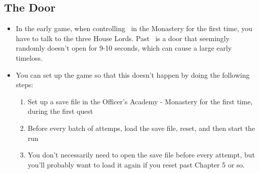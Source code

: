 \subsection*{The Door}
\begin{itemize}
\item In the early game, when controlling \Byleth\ in the Monastery for the first time, you have to talk to the three House Lords. Past \Edelgard\ is a door that seemingly randomly doesn't open for 9-10 seconds, which can cause a large early timeloss.
\item You can set up the game so that this doesn't happen by doing the following steps:
\begin{enumerate}
	\item Set up a save file in the Officer's Academy - Monastery for the first time, during the first quest
	\item Before every batch of attemps, load the save file, reset, and then start the run
	\item You don't necessarily need to open the save file before every attempt, but you'll probably want to load it again if you reset past Chapter 5 or so.
\end{enumerate}
\end{itemize}